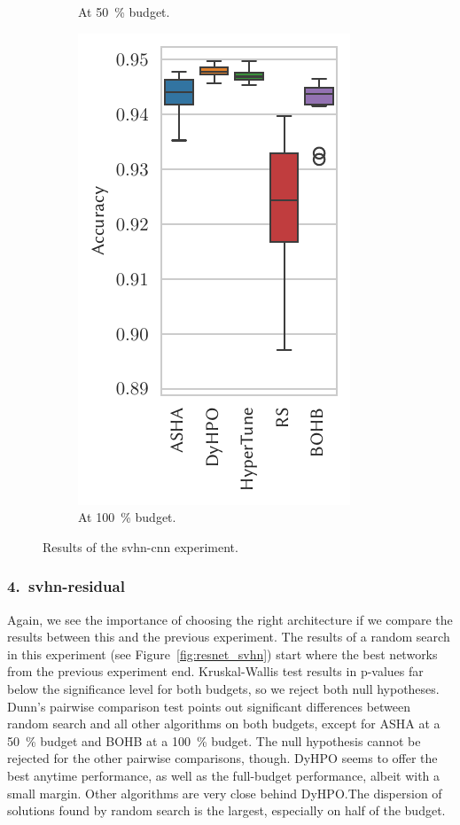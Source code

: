 \begin{figure}[H]
\begin{subfigure}{.26\textwidth}
        \caption{At \SI{50}{\percent} budget.}%
    \end{subfigure}%
    \begin{subfigure}{.26\textwidth}
        \includegraphics[height=\plotheight]{img/real_exp/svhn_simple_boxplot_full.pdf}%
        \caption{At \SI{100}{\percent} budget.}%
    \end{subfigure}%
\caption{Results of the svhn-cnn experiment.}
\label{fig:simple_svhn}
\end{figure}


\subsubsection{4.\ svhn-residual}
Again, we see the importance of choosing the right architecture if we compare the results between this and the previous experiment. The results of a random search in this experiment (see Figure~\ref{fig:resnet_svhn}) start where the best networks from the previous experiment end. Kruskal-Wallis test results in p-values far below the significance level for both budgets, so we reject both null hypotheses. Dunn's pairwise comparison test points out significant differences between random search and all other algorithms on both budgets, except for ASHA at a \SI{50}{\percent} budget and BOHB at a \SI{100}{\percent} budget. The null hypothesis cannot be rejected for the other pairwise comparisons, though. DyHPO seems to offer the best anytime performance, as well as the full-budget performance, albeit with a small margin. Other algorithms are very close behind DyHPO.\@ The dispersion of solutions found by random search is the largest, especially on half of the budget.

